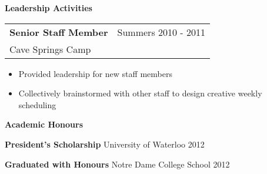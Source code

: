 \documentclass[10pt]{article}
\makeatletter
\newcommand{\resheading}[1]{{\large \colorbox{headercol}{\begin{minipage}{\textwidth}{\textbf{#1 \vphantom{p\^{E}}}}\end{minipage}}}}
\newcommand{\ressubheading}[3]{\item
\begin{tabular*}{7in}{l@{\extracolsep{\fill}}r}
    \textbf{#1} & #2 \\ #3
\end{tabular*}\vspace{-4pt}}
\newcommand{\resitem}[2]{\item{\textbf{#1} #2}}
\makeatother
\begin{document}

\resheading{Leadership Activities}
\begin{description}
    \ressubheading{Senior Staff Member} {Summers 2010 - 2011} {Cave Springs Camp}
    \begin{itemize}
        \item{Provided leadership for new staff members}
        \item{Collectively brainstormed with other staff to design creative weekly scheduling}
    \end{itemize}
\end{description}

\resheading{Academic Honours}
\begin{description}
    \resitem{President's Scholarship} {University of Waterloo \hfill 2012}
    \resitem{Graduated with Honours} {Notre Dame College School \hfill 2012}
\end{description}
\end{document}
